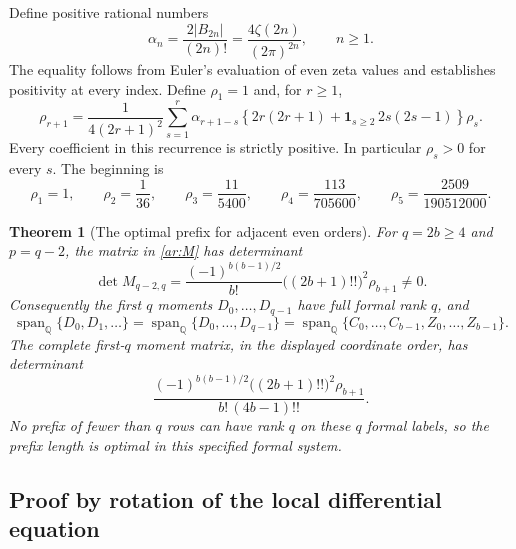 \documentclass[11pt,a4paper]{article}
\numberwithin{equation}{section}
\newtheorem{theorem}{Theorem}[section]
\theoremstyle{definition}
\theoremstyle{remark}
\begin{document}
Define positive rational numbers
\begin{equation}\label{ar:alpha}
 \alpha_n=\frac{2|B_{2n}|}{(2n)!}
         =\frac{4\zeta(2n)}{(2\pi)^{2n}},\qquad n\ge1.
\end{equation}
The equality follows from Euler's evaluation of even zeta values and
establishes positivity at every index. Define $\rho_1=1$ and, for $r\ge1$,
\begin{equation}\label{ar:rho}
 \rho_{r+1}=
 \frac{1}{4(2r+1)^2}
 \sum_{s=1}^r\alpha_{r+1-s}
  \left\{2r(2r+1)
       +\mathbf1_{s\ge2}\,2s(2s-1)\right\}\rho_s.
\end{equation}
Every coefficient in this recurrence is strictly positive. In particular
$\rho_s>0$ for every $s$. The beginning is
\[
 \rho_1=1,\qquad \rho_2=\frac1{36},\qquad
 \rho_3=\frac{11}{5400},\qquad
 \rho_4=\frac{113}{705600},\qquad
 \rho_5=\frac{2509}{190512000}.
\]

\begin{theorem}[The optimal prefix for adjacent even orders]
\label{ar:main}
For $q=2b\ge4$ and $p=q-2$, the matrix in \eqref{ar:M} has determinant
\begin{equation}\label{ar:det}
 \boxed{\displaystyle
 \det M_{q-2,q}
 =\frac{(-1)^{b(b-1)/2}}{b!}
       \bigl((2b+1)!!\bigr)^2\rho_{b+1}\ne0.}
\end{equation}
Consequently the first $q$ moments $D_0,\ldots,D_{q-1}$ have full
formal rank $q$, and
\begin{equation}\label{ar:spans}
 \operatorname{span}_{\mathbb Q}\{D_0,D_1,\ldots\}
 =\operatorname{span}_{\mathbb Q}\{D_0,\ldots,D_{q-1}\}
 =\operatorname{span}_{\mathbb Q}
     \{C_0,\ldots,C_{b-1},Z_0,\ldots,Z_{b-1}\}.
\end{equation}
The complete first-$q$ moment matrix, in the displayed coordinate order,
has determinant
\begin{equation}\label{ar:complete}
 \frac{(-1)^{b(b-1)/2}\bigl((2b+1)!!\bigr)^2\rho_{b+1}}
      {b!\,(4b-1)!!}.
\end{equation}
No prefix of fewer than $q$ rows can have rank $q$ on these $q$ formal
labels, so the prefix length is optimal in this specified formal system.
\end{theorem}

\subsection{Proof by rotation of the local differential equation}
\end{document}
